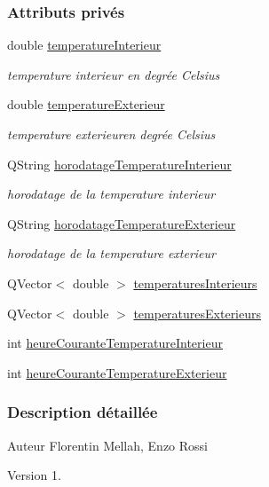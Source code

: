 \subsubsection*{Attributs privés}
\begin{DoxyCompactItemize}
\item 
double \hyperlink{class_infos_temperature_a976ab7ead7ac82b5b8572807d778689e}{temperature\+Interieur}
\begin{DoxyCompactList}\small\item\em temperature interieur en degrée Celsius \end{DoxyCompactList}\item 
double \hyperlink{class_infos_temperature_af80286a5b0e05d0379f53c0ebbc7d483}{temperature\+Exterieur}
\begin{DoxyCompactList}\small\item\em temperature exterieuren degrée Celsius \end{DoxyCompactList}\item 
Q\+String \hyperlink{class_infos_temperature_ad4c62d479b8897102a59025a56d7b4c6}{horodatage\+Temperature\+Interieur}
\begin{DoxyCompactList}\small\item\em horodatage de la temperature interieur \end{DoxyCompactList}\item 
Q\+String \hyperlink{class_infos_temperature_a5c3cd364746dc1cae5f9faee55c7555e}{horodatage\+Temperature\+Exterieur}
\begin{DoxyCompactList}\small\item\em horodatage de la temperature exterieur \end{DoxyCompactList}\item 
Q\+Vector$<$ double $>$ \hyperlink{class_infos_temperature_a39a976c10811a7589e4aba42586813c5}{temperatures\+Interieurs}
\item 
Q\+Vector$<$ double $>$ \hyperlink{class_infos_temperature_a32b2a36e737ab4bf61fc8274990c2943}{temperatures\+Exterieurs}
\item 
int \hyperlink{class_infos_temperature_a708b70383d309fa0ba355dcc3921cc23}{heure\+Courante\+Temperature\+Interieur}
\item 
int \hyperlink{class_infos_temperature_a44edcf244175896e28798f252900f774}{heure\+Courante\+Temperature\+Exterieur}
\end{DoxyCompactItemize}


\subsubsection{Description détaillée}
\begin{DoxyAuthor}{Auteur}
Florentin Mellah, Enzo Rossi
\end{DoxyAuthor}
\begin{DoxyVersion}{Version}
1. 
\end{DoxyVersion}



